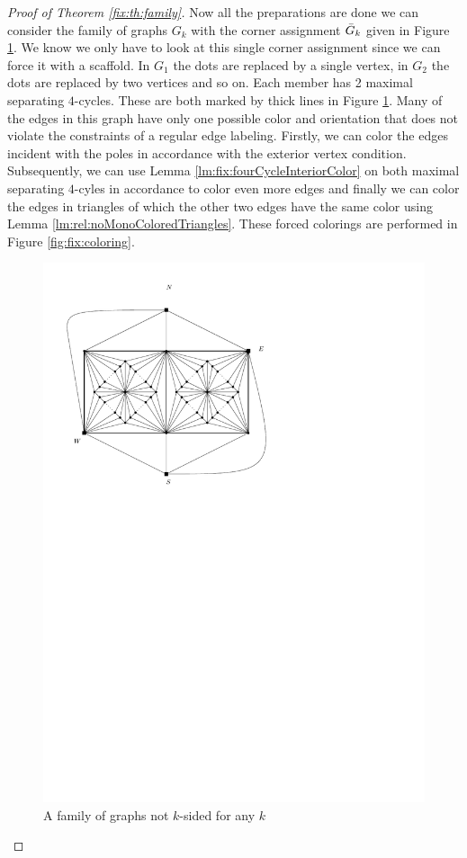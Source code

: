 \begin{proof}[Proof of Theorem \ref{fix:th:family}]
  Now all the preparations are done we can consider the family of graphs $G_k$ with the corner assignment $\bar{G}_k$ given in Figure \ref{fig:fix:manymany0}. We know we only have to look at this single corner assignment since we can force it with a scaffold. In $G_1$ the dots are replaced by a single vertex, in $G_2$ the dots are replaced by two vertices and so on. Each member has 2 maximal separating $4$-cycles. These are both marked by thick lines in Figure \ref{fig:fix:manymany0}.
  Many of the edges in this graph have only one possible color and orientation that does not violate the constraints of a regular edge labeling. Firstly, we can color the edges incident with the poles in accordance with the exterior vertex condition. Subsequently, we can use Lemma \ref{lm:fix:fourCycleInteriorColor} on both maximal separating $4$-cyles in accordance to color even more edges and finally we can color the edges in triangles of which the other two edges have  the same color using Lemma \ref{lm:rel:noMonoColoredTriangles}. These forced colorings are performed in Figure \ref{fig:fix:coloring}.

  \begin{figure}[h]
    \centering
    \includegraphics[scale=1]{fixExtension/img/manymanybase}
    \caption{A family of graphs not $k$-sided for any $k$}
    \label{fig:fix:manymany0}
  \end{figure}





\end{proof}
